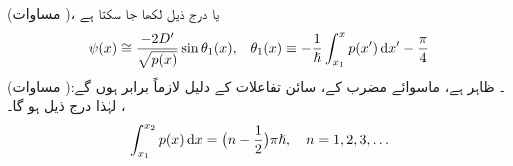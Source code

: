 (مساوات  )، یا درج ذیل لکھا جا سکتا ہے
\begin{align*}
	\psi(x)\cong\frac{-2D'}{\sqrt{p(x)}} \sin\theta_{1}(x),&&\theta_{1}(x)\equiv -\frac{1}{\hslash}\int^{x}_{x_{1}} p(x')\dif x'-\frac{\pi}{4}
\end{align*}
(مساوات )۔ ظاہر ہے، ماسوائے مضرب  کے، سائن تفاعلات کے دلیل لازماً برابر ہوں گے: ، لہٰذا درج ذیل ہو گا۔
\begin{align}\label{مساوات_وقب_کوانٹازنی_شرط_ڈھلوان_اطراف}
	\int^{x_{2}}_{x_{1}}p(x)\dif x=\big(n-\frac{1}{2}\big)\pi\hslash,\quad n=1,2,3,\dotsc
\end{align}

